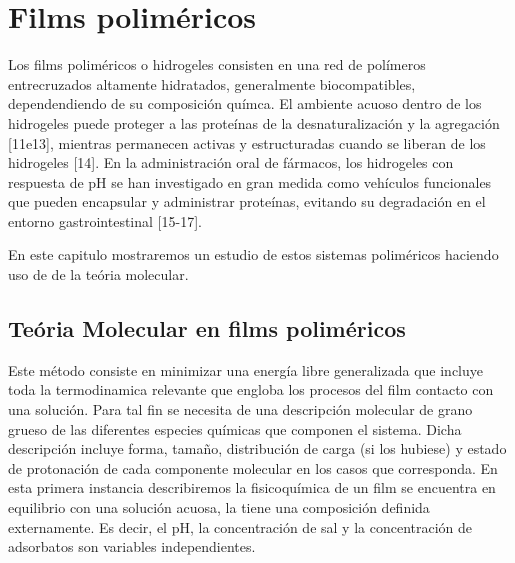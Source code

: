 
\chapter{Films polim\'ericos} %

\label{Chapter2} %



Los films polim\'ericos o hidrogeles  consisten en una red de pol\'imeros entrecruzados altamente hidratados, generalmente biocompatibles, dependendiendo de su composici\'on qu\'imca. El ambiente acuoso dentro de los hidrogeles puede proteger a las prote\'inas de la desnaturalización y la agregaci\'on [11e13], mientras permanecen activas y estructuradas cuando se liberan de los hidrogeles [14]. En la administraci\'on oral de f\'armacos, los hidrogeles con respuesta de pH se han investigado en gran medida como veh\'iculos funcionales que pueden encapsular y administrar prote\'inas, evitando su degradaci\'on en el entorno gastrointestinal [15-17].


En este capitulo mostraremos un estudio  de estos sistemas polim\'ericos haciendo uso de de la te\'oria molecular.



\section{Te\'oria Molecular en films polim\'ericos} \label{sec:film-teoria}


Este m\'etodo consiste en minimizar una energ\'ia libre generalizada que incluye toda la termodinamica relevante que engloba los procesos del film contacto con una soluci\'on.
Para tal fin se necesita de una descripci\'on molecular de grano grueso de las diferentes especies qu\'imicas que componen el sistema.
Dicha descripci\'on incluye forma, tama\~no, distribuci\'on de carga (si los hubiese) y estado de protonaci\'on de cada componente molecular en los casos que corresponda.
En esta primera instancia describiremos la fisicoqu\'imica de un film  se encuentra en  equilibrio con una solución acuosa, la tiene una composición  definida externamente.
Es decir, el pH, la concentración de sal y la concentraci\'on de adsorbatos son variables independientes.

